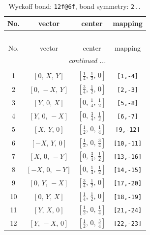 \documentclass[fleqn,8pt]{jsarticle}
\begin{document}
\renewcommand{\arraystretch}{1.2}
\begin{longtable}{cccc}
\caption{Wyckoff bond: {\tt 12f@6f}, bond symmetry: {\tt 2..}}
 \\
 \hline \hline
No. & vector & center & mapping \\ \hline \endfirsthead

\multicolumn{3}{l}{\tablename\ \thetable{}} \\
 \hline \hline
No. & vector & center & mapping \\ \hline \endhead

 \hline \hline
\multicolumn{3}{r}{\footnotesize\it continued ...} \\ \endfoot

 \hline \hline
\multicolumn{3}{r}{} \\ \endlastfoot

1 & $\left[ 0,\, X,\, Y \right]$ & $\left[ \frac{1}{4},\, \frac{1}{2},\, 0 \right]$ & {\tt [1,-4]} \\ \hline
2 & $\left[ 0,\, - X,\, Y \right]$ & $\left[ \frac{3}{4},\, \frac{1}{2},\, 0 \right]$ & {\tt [2,-3]} \\ \hline
3 & $\left[ Y,\, 0,\, X \right]$ & $\left[ 0,\, \frac{1}{4},\, \frac{1}{2} \right]$ & {\tt [5,-8]} \\ \hline
4 & $\left[ Y,\, 0,\, - X \right]$ & $\left[ 0,\, \frac{3}{4},\, \frac{1}{2} \right]$ & {\tt [6,-7]} \\ \hline
5 & $\left[ X,\, Y,\, 0 \right]$ & $\left[ \frac{1}{2},\, 0,\, \frac{1}{4} \right]$ & {\tt [9,-12]} \\ \hline
6 & $\left[ - X,\, Y,\, 0 \right]$ & $\left[ \frac{1}{2},\, 0,\, \frac{3}{4} \right]$ & {\tt [10,-11]} \\ \hline
7 & $\left[ X,\, 0,\, - Y \right]$ & $\left[ 0,\, \frac{3}{4},\, \frac{1}{2} \right]$ & {\tt [13,-16]} \\ \hline
8 & $\left[ - X,\, 0,\, - Y \right]$ & $\left[ 0,\, \frac{1}{4},\, \frac{1}{2} \right]$ & {\tt [14,-15]} \\ \hline
9 & $\left[ 0,\, Y,\, - X \right]$ & $\left[ \frac{3}{4},\, \frac{1}{2},\, 0 \right]$ & {\tt [17,-20]} \\ \hline
10 & $\left[ 0,\, Y,\, X \right]$ & $\left[ \frac{1}{4},\, \frac{1}{2},\, 0 \right]$ & {\tt [18,-19]} \\ \hline
11 & $\left[ Y,\, X,\, 0 \right]$ & $\left[ \frac{1}{2},\, 0,\, \frac{1}{4} \right]$ & {\tt [21,-24]} \\ \hline
12 & $\left[ Y,\, - X,\, 0 \right]$ & $\left[ \frac{1}{2},\, 0,\, \frac{3}{4} \right]$ & {\tt [22,-23]} \\
\end{longtable}
\end{document}
